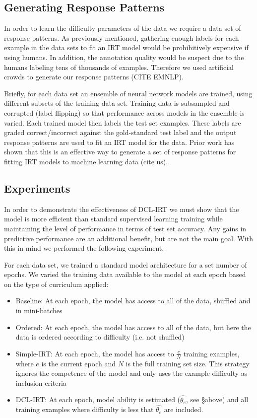 \documentclass[letterpaper]{article} %
\begin{document}
\subsection{Generating Response Patterns}

In order to learn the difficulty parameters of the data we require a data set of response patterns.
As previously mentioned, gathering enough labels for each example in the data sets to fit an IRT model would be prohibitively expensive if using humans.
In addition, the annotation quality would be suspect due to the humans labeling tens of thousands of examples.
Therefore we used artificial crowds to generate our response patterns (CITE EMNLP). 

Briefly, for each data set an ensemble of neural network models are trained, using different subsets of the training data set.
Training data is subsampled and corrupted (label flipping) so that performance across models in the ensemble is varied.
Each trained model then labels the test set examples.
These labels are graded correct/incorrect against the gold-standard test label and the output response patterns are used to fit an IRT model for the data.
Prior work has shown that this is an effective way to generate a set of response patterns for fitting IRT models to machine learning data (cite us).


\subsection{Experiments} 

In order to demonstrate the effectiveness of DCL-IRT we must show that the model is more efficient than standard supervised learning training while maintaining the level of performance in terms of test set accuracy. 
Any gains in predictive performance are an additional benefit, but are not the main goal.
With this in mind we performed the following experiment.

For each data set, we trained a standard model architecture for a set number of epochs. 
We varied the training data available to the model at each epoch based on the type of curriculum applied:

\begin{itemize}
	\item 
	Baseline: At each epoch, the model has access to all of the data, shuffled and in mini-batches
	\item 
	Ordered: At each epoch, the model has access to all of the data, but here the data is ordered according to difficulty (i.e. not shuffled) 
	\item 
	Simple-IRT: At each epoch, the model has access to $\frac{e}{N}$ training examples, where $e$ is the current epoch and $N$ is the full training set size. 
	This strategy ignores the competence of the model and only uses the example difficulty as inclusion criteria
	\item 
	DCL-IRT: At each epoch, model ability is estimated ($\hat{\theta_e}$, see \S above) and all training examples where difficulty is less that $\hat{\theta_e}$ are included.
\end{itemize}
\end{document}
